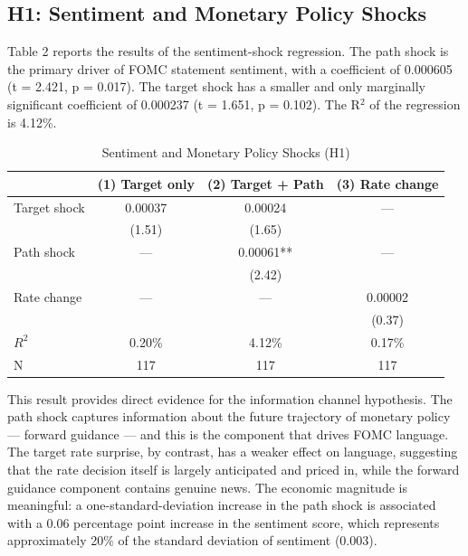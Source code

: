 \documentclass[12pt]{article}
\begin{document}
\subsection{H1: Sentiment and Monetary Policy Shocks}

Table 2 reports the results of the sentiment-shock regression. The path shock is the primary driver of FOMC statement sentiment, with a coefficient of 0.000605 (t = 2.421, p = 0.017). The target shock has a smaller and only marginally significant coefficient of 0.000237 (t = 1.651, p = 0.102). The R$^2$ of the regression is 4.12\%.


\begin{table}[htbp]\centering\caption{Sentiment and Monetary Policy Shocks (H1)}\label{tab:h1}
\begin{tabular}{lccc}\toprule
 & (1) Target only & (2) Target + Path & (3) Rate change \\\midrule
Target shock & 0.00037 & 0.00024 & --- \\
 & (1.51) & (1.65) & \\
Path shock & --- & 0.00061** & --- \\
 & & (2.42) & \\
Rate change & --- & --- & 0.00002 \\
 & & & (0.37) \\\midrule
$R^2$ & 0.20\% & 4.12\% & 0.17\% \\
N & 117 & 117 & 117 \\\bottomrule\end{tabular}
\par\vspace{2pt}{\footnotesize Newey-West HAC standard errors with lag=4. t-statistics in parentheses. ** $p < 0.05$, * $p < 0.10$.}\end{table}


This result provides direct evidence for the information channel hypothesis. The path shock captures information about the future trajectory of monetary policy --- forward guidance --- and this is the component that drives FOMC language. The target rate surprise, by contrast, has a weaker effect on language, suggesting that the rate decision itself is largely anticipated and priced in, while the forward guidance component contains genuine news. The economic magnitude is meaningful: a one-standard-deviation increase in the path shock is associated with a 0.06 percentage point increase in the sentiment score, which represents approximately 20\% of the standard deviation of sentiment (0.003).
\end{document}
